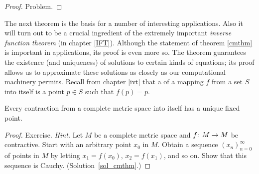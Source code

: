 \begin{proof} Problem.  \ns   \end{proof}

The next theorem is the basis for a number of interesting applications.  Also it will turn out to
be a crucial ingredient of the extremely important \emph{inverse function theorem} (in chapter
\ref{IFT}).  Although the statement of theorem \ref{cmthm} is important in applications, its proof
is even more so.  The theorem guarantees the existence (and uniqueness) of solutions to certain
kinds of equations; its proof allows us to approximate these solutions as closely as our
computational machinery permits. Recall from chapter \ref{ivt} that a
 of a mapping $f$ from a set $S$ into itself is a point $p \in S$ such that $f(p) =
p$.

\begin{thm}\label{cmthm} Every contraction from a complete metric
space into itself has a unique fixed point.
\end{thm}

\begin{proof}  Exercise. \emph{Hint.} Let $M$ be a complete metric space and $f \colon M \rightarrow M$
be contractive.  Start with an arbitrary point $x_0$ in $M$.  Obtain a sequence
$(x_n)_{n=0}^\infty$ of points in $M$ by letting $x_1 = f(x_0)$, $x_2 = f(x_1)$, and so on. Show
that this sequence is Cauchy.  (Solution~\ref{sol_cmthm}.)
\end{proof}

